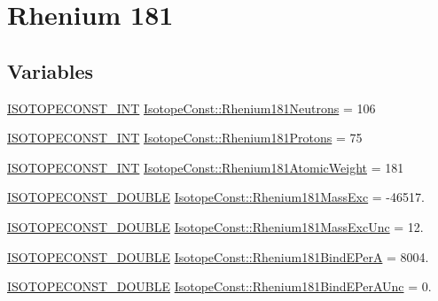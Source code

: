 \hypertarget{group___isotope_const-_rhenium-_re181}{}\section{Rhenium 181}
\label{group___isotope_const-_rhenium-_re181}
\subsection*{Variables}
\begin{DoxyCompactItemize}
\item 
\mbox{\hyperlink{group___isotope_const-_macros_ga5f18360b3e99483a35c32d789e62621c}{I\+S\+O\+T\+O\+P\+E\+C\+O\+N\+S\+T\+\_\+\+I\+NT}} \mbox{\hyperlink{group___isotope_const-_rhenium-_re181_ga16fd7e328953417e1181e66e73cda123}{Isotope\+Const\+::\+Rhenium181\+Neutrons}} = 106
\item 
\mbox{\hyperlink{group___isotope_const-_macros_ga5f18360b3e99483a35c32d789e62621c}{I\+S\+O\+T\+O\+P\+E\+C\+O\+N\+S\+T\+\_\+\+I\+NT}} \mbox{\hyperlink{group___isotope_const-_rhenium-_re181_ga8ade8fe04381de8e39fa7f8c20617ea0}{Isotope\+Const\+::\+Rhenium181\+Protons}} = 75
\item 
\mbox{\hyperlink{group___isotope_const-_macros_ga5f18360b3e99483a35c32d789e62621c}{I\+S\+O\+T\+O\+P\+E\+C\+O\+N\+S\+T\+\_\+\+I\+NT}} \mbox{\hyperlink{group___isotope_const-_rhenium-_re181_ga83a8a8f4d487fe5af7a0d2087c8ba373}{Isotope\+Const\+::\+Rhenium181\+Atomic\+Weight}} = 181
\item 
\mbox{\hyperlink{group___isotope_const-_macros_ga8f45a7272ce02c0b4c65c44636ed719a}{I\+S\+O\+T\+O\+P\+E\+C\+O\+N\+S\+T\+\_\+\+D\+O\+U\+B\+LE}} \mbox{\hyperlink{group___isotope_const-_rhenium-_re181_ga79207d768d2c411d2112b60dbdc06f88}{Isotope\+Const\+::\+Rhenium181\+Mass\+Exc}} = -\/46517.
\item 
\mbox{\hyperlink{group___isotope_const-_macros_ga8f45a7272ce02c0b4c65c44636ed719a}{I\+S\+O\+T\+O\+P\+E\+C\+O\+N\+S\+T\+\_\+\+D\+O\+U\+B\+LE}} \mbox{\hyperlink{group___isotope_const-_rhenium-_re181_ga2835233d7e6669d74e468825dcbf881b}{Isotope\+Const\+::\+Rhenium181\+Mass\+Exc\+Unc}} = 12.
\item 
\mbox{\hyperlink{group___isotope_const-_macros_ga8f45a7272ce02c0b4c65c44636ed719a}{I\+S\+O\+T\+O\+P\+E\+C\+O\+N\+S\+T\+\_\+\+D\+O\+U\+B\+LE}} \mbox{\hyperlink{group___isotope_const-_rhenium-_re181_ga172f7820781710ad055f2c1a830cf5ff}{Isotope\+Const\+::\+Rhenium181\+Bind\+E\+PerA}} = 8004.
\item 
\mbox{\hyperlink{group___isotope_const-_macros_ga8f45a7272ce02c0b4c65c44636ed719a}{I\+S\+O\+T\+O\+P\+E\+C\+O\+N\+S\+T\+\_\+\+D\+O\+U\+B\+LE}} \mbox{\hyperlink{group___isotope_const-_rhenium-_re181_gaa95590c359f8e804d9ca75beb66be092}{Isotope\+Const\+::\+Rhenium181\+Bind\+E\+Per\+A\+Unc}} = 0.

\end{DoxyCompactItemize}

